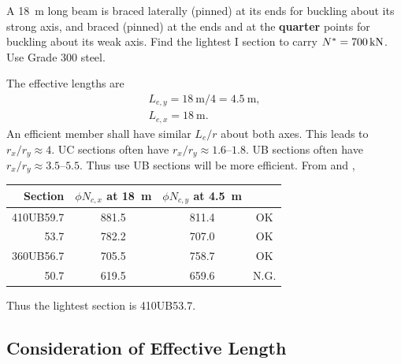 \begin{exmp}
A \SI{18}{\meter} long beam is braced laterally (pinned) at its ends for buckling about its strong axis, and braced (pinned) at the ends and at the \textbf{quarter} points for buckling about its weak axis. Find the lightest I section to carry $N^*=\SI{700}{\kilo\newton}$. Use Grade 300 steel.
\end{exmp}
\begin{solution}
The effective lengths are
\begin{gather*}
L_{e,y}=\SI{18}{\meter}/4=\SI{4.5}{\meter},\\
L_{e,x}=\SI{18}{\meter}.
\end{gather*}
An efficient member shall have similar $L_{e}/r$ about both axes. This leads to $r_x/r_y\approx4$. UC sections often have $r_x/r_y\approx\numrange{1.6}{1.8}$. UB sections often have $r_x/r_y\approx\numrange{3.5}{5.5}$. Thus use UB sections will be more efficient. From  and ,
\begin{table}[H]
\centering
\begin{tabular}{rccc}
	\toprule
	  Section & $\phi{}N_{c,x}$ at \SI{18}{\meter} & $\phi{}N_{c,y}$ at \SI{4.5}{\meter} &      \\ \midrule
	410UB59.7 &               881.5                &                811.4                & OK   \\
	     53.7 &               782.2                &                707.0                & OK   \\
	360UB56.7 &               705.5                &                758.7                & OK   \\
	     50.7 &               619.5                &                659.6                & N.G. \\ \bottomrule
\end{tabular}
\end{table}
Thus the lightest section is 410UB53.7.
\end{solution}
\subsection{Consideration of Effective Length}
